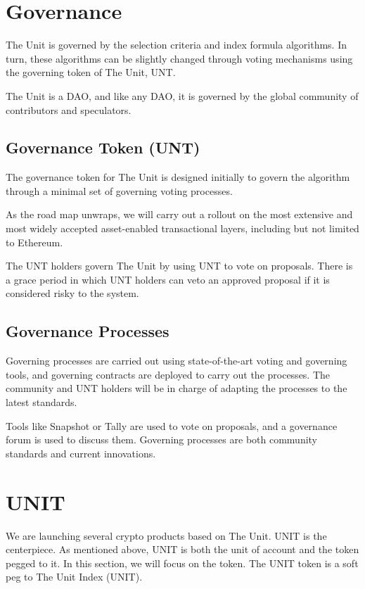 \documentclass[12pt]{article}
\begin{document}
\section{Governance}

The Unit is governed by the selection criteria and index formula algorithms. In turn, these algorithms can be slightly changed through voting mechanisms using the governing token of The Unit, UNT.

The Unit is a DAO, and like any DAO, it is governed by the global community of contributors and speculators. 

\subsection{Governance Token (UNT)}

The governance token for The Unit is designed initially to govern the algorithm through a minimal set of governing voting processes. 

As the road map unwraps, we will carry out a rollout on the most extensive and most widely accepted asset-enabled transactional layers, including but not limited to Ethereum.

The UNT holders govern The Unit by using UNT to vote on proposals. There is a grace period in which UNT holders can veto an approved proposal if it is considered risky to the system.

\subsection{Governance Processes}

Governing processes are carried out using state-of-the-art voting and governing tools, and governing contracts are deployed to carry out the processes. The community and UNT holders will be in charge of adapting the processes to the latest standards.

Tools like Snapshot or Tally are used to vote on proposals, and a governance forum is used to discuss them. Governing processes are both community standards and current innovations.

\section{UNIT}

We are launching several crypto products based on The Unit. UNIT is the centerpiece. As mentioned above, UNIT is both the unit of account and the token pegged to it. In this section, we will focus on the token. The UNIT token is a soft peg to The Unit Index (UNIT).
\end{document}
